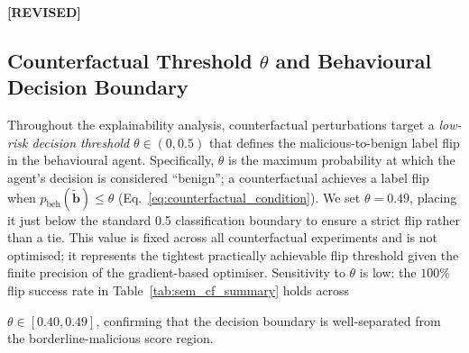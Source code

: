 \documentclass[3p]{elsarticle}
\begin{document}
\begin{table}[t]
\centering
{}
\caption{Fusion and triage performance under safety-optimal and low-escalation policies.}
\label{tab:fusion_policies}
\end{table}

\colorbox{yellow!25}{\bfseries [REVISED]}~
\subsection{Counterfactual Threshold $\theta$ and Behavioural Decision Boundary}
\label{subsec:theta}

Throughout the explainability analysis, counterfactual perturbations target a
\emph{low-risk decision threshold} $\theta \in (0, 0.5)$ that defines the malicious-to-benign
label flip in the behavioural agent. Specifically, $\theta$ is the maximum probability at
which the agent's decision is considered ``benign''; a counterfactual achieves a label flip
when $p_{\mathrm{beh}}(\tilde{\mathbf{b}}) \le \theta$ (Eq.~\ref{eq:counterfactual_condition}).
We set $\theta = 0.49$, placing it just below the standard 0.5 classification boundary to
ensure a strict flip rather than a tie. This value is fixed across all counterfactual
experiments and is not optimised; it represents the tightest practically achievable flip
threshold given the finite precision of the gradient-based optimiser. Sensitivity to $\theta$
is low: the $100\%$ flip success rate in Table~\ref{tab:sem_cf_summary} holds across
\begin{changedblock}
$\theta \in [0.40, 0.49]$, confirming that the decision boundary is well-separated from the
borderline-malicious score region.
\end{changedblock}
\end{document}
